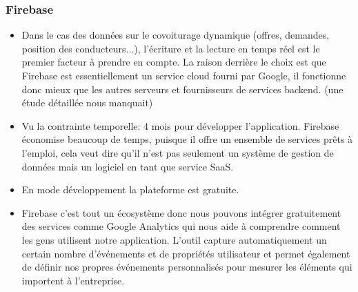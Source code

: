 \subsubsection{Firebase} %
\label{ssub:firebase}
\begin{itemize}
	\item Dans le cas des données sur le covoiturage dynamique (offres, demandes, position des conducteurs...), l’écriture et la lecture en temps réel est le premier facteur à prendre en compte. La raison derrière le choix est que Firebase est essentiellement un service cloud fourni par Google, il fonctionne donc mieux que les autres serveurs et fournisseurs de services backend. (une étude détaillée nous manquait)
	\item Vu la contrainte temporelle: 4 mois pour développer l'application. Firebase économise beaucoup de temps, puisque il offre un ensemble de services prêts à l'emploi, cela veut dire qu'il n'est pas seulement un système de gestion de données mais un logiciel en tant que service SaaS.
	\item En mode développement la plateforme est gratuite.
	\item Firebase c'est tout un écosystème donc nous pouvons intégrer gratuitement des services comme Google Analytics qui nous aide à comprendre comment les gens utilisent notre application. L'outil capture automatiquement un certain nombre d'événements et de propriétés utilisateur et permet également de définir nos propres événements personnalisés pour mesurer les éléments qui importent à l'entreprise. 
\end{itemize}
